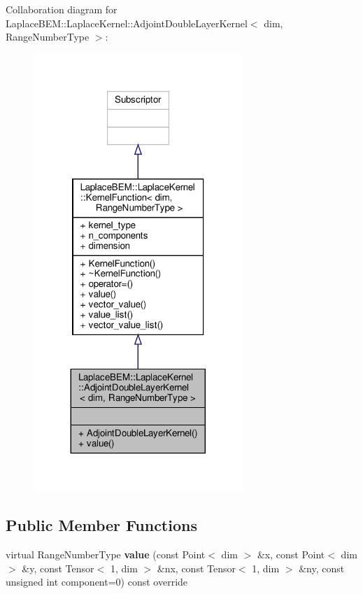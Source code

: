 Collaboration diagram for Laplace\+B\+EM\+:\+:Laplace\+Kernel\+:\+:Adjoint\+Double\+Layer\+Kernel$<$ dim, Range\+Number\+Type $>$\+:\nopagebreak
\begin{figure}[H]
\begin{center}
\leavevmode
\includegraphics[width=224pt]{classLaplaceBEM_1_1LaplaceKernel_1_1AdjointDoubleLayerKernel__coll__graph}
\end{center}
\end{figure}
\subsection*{Public Member Functions}
\begin{DoxyCompactItemize}
\item 
\mbox{\label{classLaplaceBEM_1_1LaplaceKernel_1_1AdjointDoubleLayerKernel_acfa06279ea767680f2fbefee07a34304}} 
virtual Range\+Number\+Type {\bfseries value} (const Point$<$ dim $>$ \&x, const Point$<$ dim $>$ \&y, const Tensor$<$ 1, dim $>$ \&nx, const Tensor$<$ 1, dim $>$ \&ny, const unsigned int component=0) const override
\end{DoxyCompactItemize}
